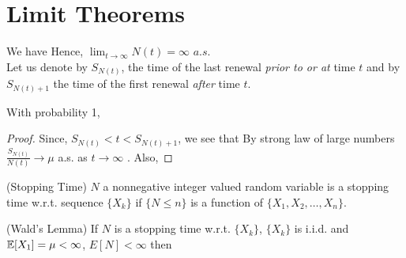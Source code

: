 \documentclass[all-lectures.tex]{subfiles}
\author{}
\begin{document}
\setcounter{chapter}{2}
\setcounter{section}{1}
\section*{}

\section{Limit Theorems}
We have 
Hence, $\lim_{t\to\infty} N(t) = \infty$ $a.s$. \\
\indent Let us denote by $S_{N(t)}$, the time of the last renewal \textit{prior to or at} time $t$ and by $S_{N(t)+1}$ the time of the first renewal \textit{after} time $t$.
\begin{prop}
With probability 1,
\end{prop}
\begin{proof}
Since, $S_{N(t)} < t < S_{N(t)+1}$, we see that
By strong law of large numbers $\frac{S_{N(t)}}{N(t)} \to \mu$ a.s. as $t \to \infty$ . Also,
 \qedhere
\end{proof}

\begin{defn}
(Stopping Time)
$N$ a nonnegative integer valued random variable is a stopping time w.r.t. sequence $\{X_k\}$ if $\{ N\le n\}$ is a function of $\{X_{1}, X_{2}, \dots, X_n\}$.
\end{defn}
\begin{thm}
(Wald's Lemma)
If $N$ is a stopping time w.r.t. $\{X_k\}$, $\{X_k\}$ is i.i.d. and $\mathbb{E}[X_1] = \mu < \infty$, $E[N] < \infty$ then
\end{thm}
\end{document}
